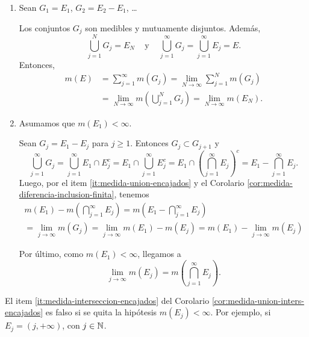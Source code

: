 \begin{demo}{}
\begin{enumerate}
    \item Sean $G_1=E_1$,\; $G_2=E_2-E_1$, \ldots
    
    Los conjuntos $G_j$ son medibles y mutuamente disjuntos. Adem\'as, 
    \[
    \bigcup\limits_{j=1}^{N}G_j =E_N\;\;\;
    \mbox{ y }\;\;\;
    \bigcup\limits_{j=1}^{\infty}G_j 
    =\bigcup\limits_{j=1}^{\infty} E_j=E.
    \]
    Entonces, 
    \[\begin{split}
    m(E)&=\sum\limits_{j=1}^{\infty}m(G_j)=
    \lim\limits_{N \to \infty} \sum\limits_{j=1}^N m(G_j)\\
    &=
    \lim\limits_{N \to \infty} m\left(\bigcup\limits_{j=1}^N G_j\right)=\lim\limits_{N\to \infty}m(E_N).
    \end{split}
    \]
    \item Asumamos que $m(E_1)<\infty$.
    
    Sean $G_j=E_{1}-E_j$ para $j\geq 1$. Entonces 
    $G_j \subset G_{j+1}$ y 
    \[
    \bigcup\limits_{j=1}^{\infty} G_j=
    \bigcup\limits_{j=1}^{\infty} E_{1}\cap E_j^c=
    E_1 \cap \bigcup\limits_{j=1}^{\infty} E_j^c=
    E_1 \cap\left( \bigcap\limits_{j=1}^{\infty} E_j \right)^c=
    E_1 -  \bigcap\limits_{j=1}^{\infty} E_j.
    \]
    Luego, por el item \ref{it:medida-union-encajados} y el Corolario \ref{cor:medida-diferencia-inclusion-finita}, tenemos
    \begin{multline*}
     m(E_1) - m( \bigcap\limits_{j=1}^{\infty} E_j)= m(E_1 -  \bigcap\limits_{j=1}^{\infty} E_j)\\=
    \lim\limits_{j \to \infty} m(G_j)=\lim\limits_{j \to \infty} m(E_1)-m(E_j)=
      m(E_1)-\lim\limits_{j \to \infty}m(E_j)
    \end{multline*}
 
     Por \'ultimo, como $m(E_1)<\infty$, llegamos a
     \[
     \lim\limits_{j \to \infty} m(E_j)=m\left(\bigcap\limits_{j=1}^{\infty} E_j\right).
     \]
\end{enumerate}
\end{demo}

\begin{observacion}{}
El item \ref{it:medida-interseccion-encajados} del Corolario \ref{cor:medida-union-inters-encajados} es  falso si se quita la hip\'otesis $m(E_j)<\infty$. 
Por ejemplo, si $E_j=(j, +\infty)$, con $j\in \mathbb{N}$.
\end{observacion}

